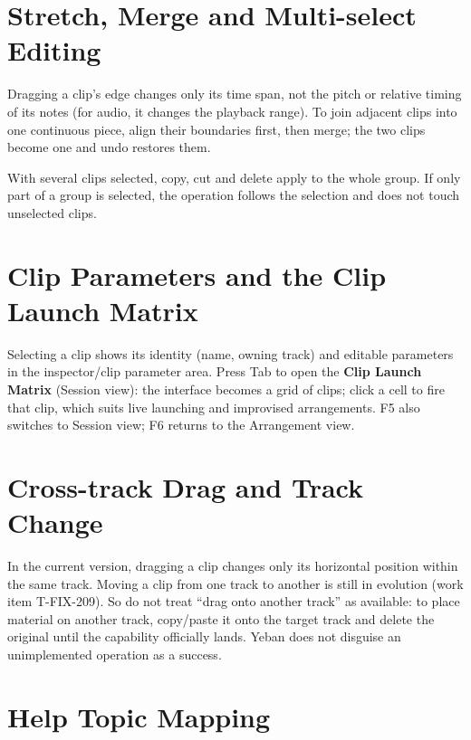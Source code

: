 \section{Stretch, Merge and Multi-select Editing}

Dragging a clip's edge changes only its time span, not the pitch or relative timing of
its notes (for audio, it changes the playback range). To join adjacent clips into one
continuous piece, align their boundaries first, then merge; the two clips become one
and undo restores them.

With several clips selected, copy, cut and delete apply to the whole group. If only
part of a group is selected, the operation follows the selection and does not touch
unselected clips.


\section{Clip Parameters and the Clip Launch Matrix}

Selecting a clip shows its identity (name, owning track) and editable parameters in
the inspector/clip parameter area. Press Tab to open the \textbf{Clip Launch Matrix}
(Session view): the interface becomes a grid of clips; click a cell to fire that clip,
which suits live launching and improvised arrangements. F5 also switches to Session
view; F6 returns to the Arrangement view.


\section{Cross-track Drag and Track Change}

In the current version, dragging a clip changes only its horizontal position within
the same track. Moving a clip from one track to another is still in evolution
(work item T-FIX-209). So do not treat ``drag onto another track'' as available: to
place material on another track, copy/paste it onto the target track and delete the
original until the capability officially lands. Yeban does not disguise an
unimplemented operation as a success.

\section{Help Topic Mapping}

